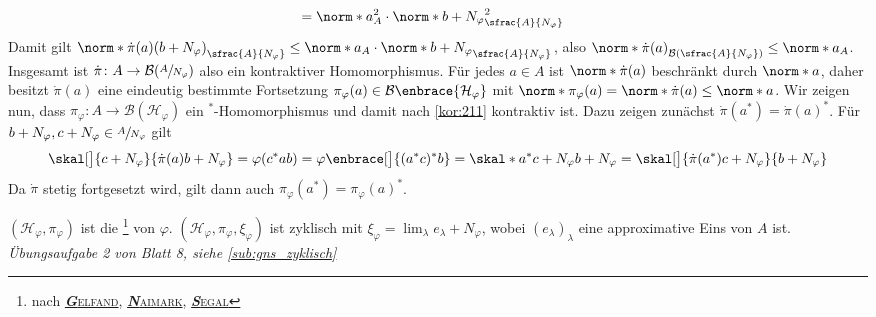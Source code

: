 \begin{satzUnshaded}[{name={GNS-Konstruktion}},label=gns]
\begin{align}
		&= \norm*{a}_A^2 \cdot \norm*{b+N_\varphi}^2_{\sfrac{A}{N_\varphi}}
	\end{align}
	Damit gilt $\norm*{\dot{\pi}(a)(b+N_\varphi)}_{\sfrac{A}{N_\varphi}} \le \norm*{a}_A \cdot \norm*{b+N_\varphi}_{\sfrac{A}{N_\varphi}}$, also $\norm*{\dot{\pi}(a)}_{\mathcal{B}(\sfrac{A}{N_\varphi})} \le \norm*{a}_A$.
	Insgesamt ist $\dot{\pi}\colon A \to \mathcal{B}(\sfrac{A}{N_\varphi})$ also ein kontraktiver Homomorphismus.
	Für jedes $a \in A$ ist $\norm*{\dot{\pi}(a)}$ beschränkt durch $\norm*{a}$, daher besitzt $\dot{\pi}(a)$ eine eindeutig bestimmte Fortsetzung $\pi_\varphi(a) \in \mathcal{B}\enbrace{\mathcal{H}_\varphi}$ mit $\norm*{\pi_\varphi(a)} = \norm*{\dot{\pi}(a)}\le \norm*{a}$.
	Wir zeigen nun, dass $\pi_\varphi \colon A \to \mathcal{B}(\mathcal{H}_\varphi)$ ein $^*$-Homomorphismus und damit nach \autoref{kor:211} kontraktiv ist.
	Dazu zeigen zunächst $\dot{\pi}(a^*)=\dot{\pi}(a)^*$. Für $b +N_\varphi,c+N_\varphi \in \sfrac{A}{N_\varphi}$ gilt
	\[
		\skal[\big]{c+N_\varphi}{\dot{\pi}(a) b+N_\varphi} = \varphi(c^*ab) = \varphi \enbrace[\big]{(a^*c)^*b} = \skal*{a^*c +N_\varphi}{b+N_\varphi}= \skal[\big]{\dot{\pi}(a^*)c+N_\varphi}{b+N_\varphi}
	\]
	Da $\dot{\pi}$ stetig fortgesetzt wird, gilt dann auch $\pi_\varphi(a^*)=\pi_\varphi(a)^*$.
	
	$(\mathcal{H}_\varphi,\pi_\varphi)$ ist die \footnote{nach \href{https://de.wikipedia.org/wiki/Israel_Moissejewitsch_Gelfand}{\textsc{\textbf{\emph{G}}elfand}}, \href{https://de.wikipedia.org/wiki/Mark_Neumark}{\textsc{\textbf{\emph{N}}aimark}}, \href{https://de.wikipedia.org/wiki/Irving_Segal}{\textsc{\textbf{\emph{S}}egal}}} von $\varphi$.
	$(\mathcal{H}_\varphi,\pi_\varphi,\xi_\varphi)$ ist zyklisch mit $\xi_\varphi = \lim_\lambda e_\lambda+N_\varphi$, wobei $(e_\lambda)_\lambda$ eine approximative Eins von $A$ ist. \emph{Übungsaufgabe 2 von Blatt 8, siehe \cref{sub:gns_zyklisch}}
\end{satzUnshaded}

